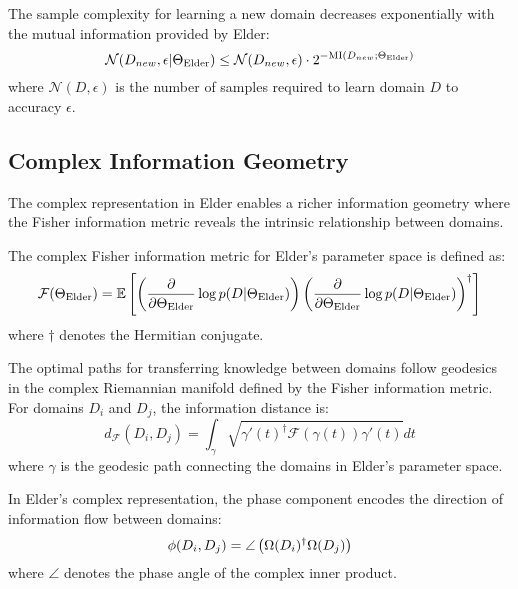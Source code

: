 \begin{corollary}
The sample complexity for learning a new domain decreases exponentially with the mutual information provided by Elder:
\begin{equation}
\mathcal{N}(D_{new}, \epsilon | \Theta_{\text{Elder}}) \leq \mathcal{N}(D_{new}, \epsilon) \cdot 2^{-\text{MI}(D_{new}; \Theta_{\text{Elder}})}
\end{equation}
where $\mathcal{N}(D, \epsilon)$ is the number of samples required to learn domain $D$ to accuracy $\epsilon$.
\end{corollary}

\subsection{Complex Information Geometry}

The complex representation in Elder enables a richer information geometry where the Fisher information metric reveals the intrinsic relationship between domains.

\begin{definition}
The complex Fisher information metric for Elder's parameter space is defined as:
\begin{equation}
\mathcal{F}(\Theta_{\text{Elder}}) = \mathbb{E}\left[ \left(\frac{\partial}{\partial \Theta_{\text{Elder}}} \log p(D | \Theta_{\text{Elder}})\right) \left(\frac{\partial}{\partial \Theta_{\text{Elder}}} \log p(D | \Theta_{\text{Elder}})\right)^{\dagger} \right]
\end{equation}
where $\dagger$ denotes the Hermitian conjugate.
\end{definition}

\begin{theorem}
The optimal paths for transferring knowledge between domains follow geodesics in the complex Riemannian manifold defined by the Fisher information metric. For domains $D_i$ and $D_j$, the information distance is:
\begin{equation}
d_{\mathcal{F}}(D_i, D_j) = \int_{\gamma} \sqrt{\gamma'(t)^{\dagger} \mathcal{F}(\gamma(t)) \gamma'(t)} dt
\end{equation}
where $\gamma$ is the geodesic path connecting the domains in Elder's parameter space.
\end{theorem}

\begin{proposition}
In Elder's complex representation, the phase component encodes the direction of information flow between domains:
\begin{equation}
\phi(D_i, D_j) = \angle \left( \Omega(D_i)^{\dagger} \Omega(D_j) \right)
\end{equation}
where $\angle$ denotes the phase angle of the complex inner product.
\end{proposition}


